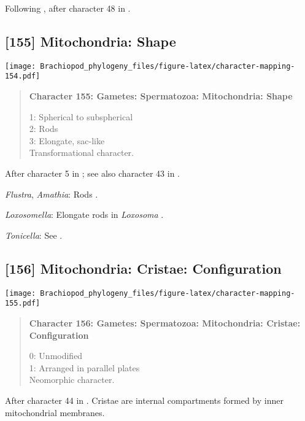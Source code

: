 \documentclass[openany]{book}
\theoremstyle{definition}
\theoremstyle{definition}
\theoremstyle{definition}
\theoremstyle{remark}
\begin{document}
Following \citet{Smith2012}, after character 48 in \citet{Ponder1997}.

\subsection*{{[}155{]} Mitochondria: Shape}\label{mitochondria-shape}

\texttt{[image: Brachiopod\_phylogeny\_files/figure-latex/character-mapping-154.pdf]}

\begin{quote}
\textbf{Character 155: Gametes: Spermatozoa: Mitochondria: Shape}

1: Spherical to subspherical\\
2: Rods\\
3: Elongate, sac-like\\
Transformational character.
\end{quote}

After character 5 in \citet{BucklandNicks2008}; see also character 43 in
\citet{Ponder1997}.

\hypertarget{Amathia-coding-155}{}
\emph{Flustra}, \emph{Amathia}: Rods \citep{Franzen1981}.

\hypertarget{Loxosomella-coding-155}{}
\emph{Loxosomella}: Elongate rods in \emph{Loxosoma}
\citep{Franzen2000}.

\hypertarget{Tonicella-coding-155}{}
\emph{Tonicella}: See \citet{BucklandNicks1988}.

\subsection*{{[}156{]} Mitochondria: Cristae:
Configuration}\label{mitochondria-cristae-configuration}

\texttt{[image: Brachiopod\_phylogeny\_files/figure-latex/character-mapping-155.pdf]}

\begin{quote}
\textbf{Character 156: Gametes: Spermatozoa: Mitochondria: Cristae:
Configuration}

0: Unmodified\\
1: Arranged in parallel plates\\
Neomorphic character.
\end{quote}

After character 44 in \citet{Ponder1997}. Cristae are internal
compartments formed by inner mitochondrial membranes.
\end{document}
